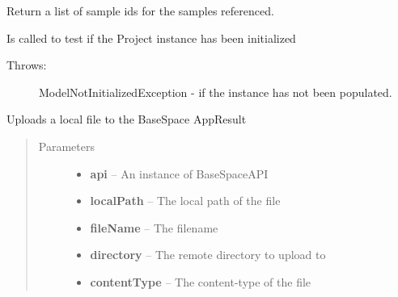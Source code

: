 \documentclass[letterpaper,10pt,english]{sphinxmanual}
\begin{document}
\begin{fulllineitems}
\begin{fulllineitems}
\end{fulllineitems}


\begin{fulllineitems}
\label{Available modules:BaseSpacePy.model.AppResult.AppResult.getReferencedSamplesIds}
Return a list of sample ids for the samples referenced.

\end{fulllineitems}


\begin{fulllineitems}
\label{Available modules:BaseSpacePy.model.AppResult.AppResult.isInit}
Is called to test if the Project instance has been initialized
\begin{description}
\item[{Throws:}] \leavevmode
ModelNotInitializedException  - if the instance has not been populated.

\end{description}

\end{fulllineitems}


\begin{fulllineitems}
\label{Available modules:BaseSpacePy.model.AppResult.AppResult.uploadFile}
Uploads a local file to the BaseSpace AppResult
\begin{quote}\begin{description}
\item[{Parameters}] \leavevmode\begin{itemize}
\item {} 
\textbf{api} -- An instance of BaseSpaceAPI

\item {} 
\textbf{localPath} -- The local path of the file

\item {} 
\textbf{fileName} -- The filename

\item {} 
\textbf{directory} -- The remote directory to upload to

\item {} 
\textbf{contentType} -- The content-type of the file

\end{itemize}

\end{description}\end{quote}

\end{fulllineitems}


\end{fulllineitems}
\end{document}

